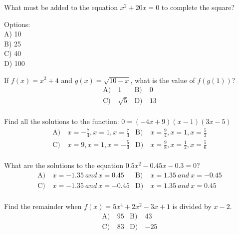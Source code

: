 \begin{problem}\label{AI-Algebra5}
What must be added to the equation \( x^2 + 20x = 0 \) to complete the square?

\noindent Options:\\
A) 10\\
B) 25\\
C) 40\\
D) 100
\end{problem}


\begin{problem}\label{Alg2-14}
If $f(x)=x^2+4$ and $g(x)=\sqrt{10-x}$, what is the value of $f(g(1))$?
\begin{align*}
\text{A)}\ & 1 &
\text{B)}\ & 0 \\
\text{C)}\ & \sqrt{5}  &
\text{D)}\ & 13\\
\end{align*}    
\end{problem}


\begin{problem}\label{Alg2-15}
Find all the solutions to the function: $0=(-4x+9)(x-1)(3x-5)$
\begin{align*}
\text{A)}\ & x=-\frac{7}{4}, x=1, x=\frac{7}{3} &
\text{B)}\ & x=\frac{9}{4}, x=1, x=\frac{5}{3} \\
\text{C)}\ & x=9, x=1, x=-\frac{5}{3}  &
\text{D)}\ & x=\frac{9}{8}, x=\frac{1}{2}, x =\frac{5}{6}\\
\end{align*}    
\end{problem}


\begin{problem}\label{Alg2-16}
What are the solutions to the equation $0.5x^2-0.45x-0.3=0$?
\begin{align*}
\text{A)}\ & x=-1.35 \ and \ x=0.45 &
\text{B)}\ & x=1.35 \ and \ x=-0.45 \\
\text{C)}\ & x=-1.35 \ and \ x=-0.45  &
\text{D)}\ & x=1.35 \ and \ x=0.45\\
\end{align*}    
\end{problem}


\begin{problem}\label{Alg2-17}
Find the remainder when $f(x)=5x^4+2x^2-3x+1$ is divided by $x-2$.
\begin{align*}
\text{A)}\ & 95 &
\text{B)}\ & 43 \\
\text{C)}\ & 83  &
\text{D)}\ & -25\\
\end{align*}    
\end{problem}


